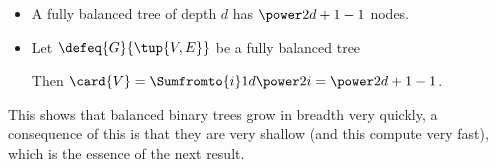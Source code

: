 \begin{module}[id=bbt-size]
\begin{frame}
\begin{itemize}
\begin{sproof}[id=size-lemma-pf,proofend=,for=size-lemma]{via induction over the depth $i$.}
\begin{spfcases}{We have to consider two cases}
\begin{spfcase}{$i>0$}
\begin{spfstep}
           As $G$ is  and $\gdepth{G}=n>i$, $\livar{V}{i-1}$ cannot contain
            leaves.
          \end{spfstep}
          \begin{spfstep}[type=conclusion]
           Thus $\eq{\card{\livar{V}i},{\atimes[cdot]{2,\card{\livar{V}{i-1}}}},{\atimes[cdot]{2,\power2{i-1}}},\power2i}$.
          \end{spfstep}
        \end{spfcase}
      \end{spfcases}
    \end{sproof}
  \item 
    \begin{assertion}[id=fbbt,type=corollary]   
      A fully balanced tree of depth $d$ has $\power2{d+1}-1$ nodes.
    \end{assertion}
  \item
      \begin{sproof}[for=fbbt,id=fbbt-pf]{}
        \begin{spfstep}
          Let $\defeq{G}{\tup{V,E}}$ be a fully balanced tree
        \end{spfstep}
        \begin{spfstep}
          Then $\card{V}=\Sumfromto{i}1d{\power2i}= \power2{d+1}-1$.
        \end{spfstep}
      \end{sproof}
    \end{itemize}
  \end{frame}
\begin{note}
  \begin{omtext}[type=conclusion,for=binary-tree]
    This shows that balanced binary trees grow in breadth very quickly, a consequence of
    this is that they are very shallow (and this compute very fast), which is the essence of
    the next result.
  \end{omtext}
\end{note}
\end{module}


